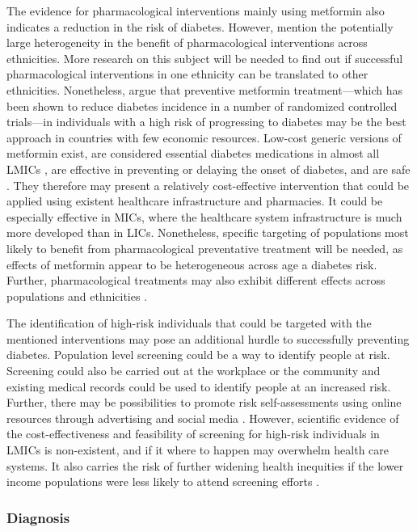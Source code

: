 The evidence for pharmacological interventions mainly using metformin also indicates a reduction in the risk of diabetes. However, \textcite{Cefalu2016} mention the potentially large heterogeneity in the benefit of pharmacological interventions across ethnicities. More research on this subject will be needed to find out if successful pharmacological interventions in one ethnicity can be translated to other ethnicities. Nonetheless, \textcite{Cefalu2016} argue that preventive metformin treatment---which has been shown to reduce diabetes incidence in a number of randomized controlled trials---in individuals with a high risk of progressing to diabetes may be the best approach in countries with few economic resources. Low-cost generic versions of metformin exist, are considered essential diabetes medications in almost all \acp{LMIC} \parencite{Bazargani2014}, are effective in preventing or delaying the onset of diabetes, and are safe \parencite{Gomes2013}. They therefore may present a relatively cost-effective intervention that could be applied using existent healthcare infrastructure and pharmacies. It could be especially effective in \acp{MIC}, where the healthcare system infrastructure is much more developed than in \acp{LIC}. Nonetheless, specific targeting of populations most likely to benefit from pharmacological preventative treatment will be needed, as effects of metformin appear to be heterogeneous across age a diabetes risk. Further, pharmacological treatments may also exhibit different effects across populations and ethnicities \parencite{Cefalu2016}. 

The identification of high-risk individuals that could be targeted with the mentioned interventions may pose an additional hurdle to successfully preventing diabetes. Population level screening could be a way to identify people at risk. Screening could also be carried out at the workplace or the community and existing medical records could be used to identify people at an increased risk. Further, there may be possibilities to promote risk self-assessments using online resources through advertising and social media \parencite{Cefalu2016}. However, scientific evidence of the cost-effectiveness and feasibility of screening for high-risk individuals in \acp{LMIC} is non-existent, and if it where to happen may overwhelm health care systems. It also carries the risk of further widening health inequities if the lower income populations were less likely to attend screening efforts \parencite{Wareham2016}.


\subsubsection{Diagnosis}

